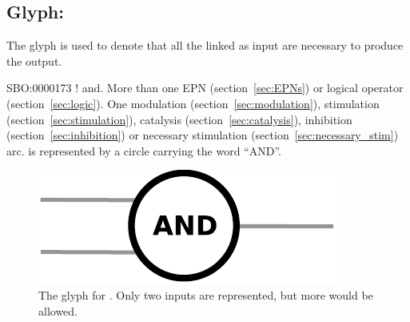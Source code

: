 \subsection{Glyph: }\label{sec:and}

The glyph  is used to denote that all the  linked as input are necessary to produce the output.  

\begin{glyphDescription}
 \glyphSboTerm SBO:0000173 ! and.
 \glyphOrigin More than one EPN (section~\ref{sec:EPNs}) or logical operator (section~\ref{sec:logic}).
 \glyphTarget  One modulation (section~\ref{sec:modulation}), stimulation (section~\ref{sec:stimulation}), catalysis (section~\ref{sec:catalysis}), inhibition (section~\ref{sec:inhibition}) or necessary stimulation (section~\ref{sec:necessary_stim}) arc.
 \glyphNode {} is represented by a circle carrying the word ``AND''.
\end{glyphDescription}

\begin{figure}[H]
  \centering
  \includegraphics[scale = 0.5]{images/and}
  \caption{The \PD glyph for . Only two inputs are represented, but more would be allowed.}
  \label{fig:and}
\end{figure}


% 
\normalcolor
